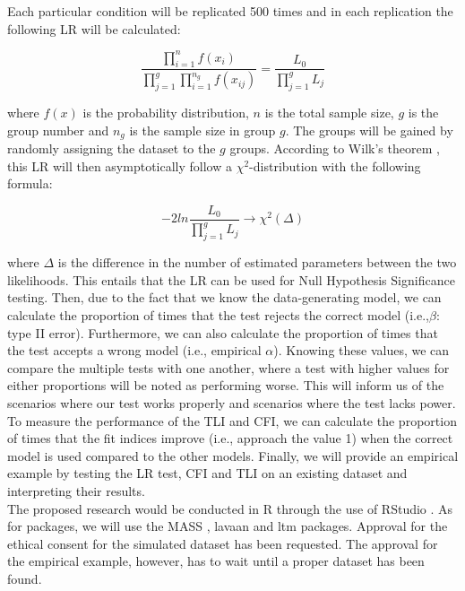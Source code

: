 \documentclass{article}
\begin{document}
Each particular condition will be replicated 500 times and in each replication the following LR will be calculated:

\begingroup
\Large
\begin{equation}
\frac{\prod_{i=1}^n f(x_i)}{\prod_{j=1}^g\prod_{i=1}^{n_g} f(x_{ij})} = \frac{L_0}{\prod_{j = 1}^g L_j}
\end{equation}
\endgroup

where $f(x)$ is the probability distribution, $n$ is the total sample size, $g$ is the group number and $n_g$ is the sample size in group $g$. The groups will be gained by randomly assigning the dataset to the $g$ groups. According to Wilk's theorem \autocite{wilkth}, this LR will then asymptotically follow a $\chi^2$-distribution with the following formula:

\begingroup
\Large
\begin{equation}
- 2ln\frac{L_0}{\prod_{j = 1}^g L_j} \rightarrow \chi^{2}(\Delta)
\end{equation}
\endgroup

where $\Delta$ is the difference in the number of estimated parameters between the two likelihoods. This entails that the LR can be used for Null Hypothesis Significance testing. Then, due to the fact that we know the data-generating model, we can calculate the proportion of times that the test rejects the correct model (i.e.,$\beta$: type II error). Furthermore, we can also calculate the proportion of times that the test accepts a wrong model (i.e., empirical $\alpha$). Knowing these values, we can compare the multiple tests with one another, where a test with higher values for either proportions will be noted as performing worse. This will inform us of the scenarios where our test works properly and scenarios where the test lacks power. 
To measure the performance of the TLI and CFI, we can calculate the proportion of times that the fit indices improve (i.e., approach the value 1) when the correct model is used compared to the other models. Finally, we will provide an empirical example by testing the LR test, CFI and TLI on an existing dataset and interpreting their results. \\
\indent The proposed research would be conducted in R \autocite{R} through the use of RStudio \autocite{Rstudio}. As for packages, we will use the MASS \autocite{mass}, lavaan \autocite{lavaan} and ltm \autocite{ltmpack} packages. Approval for the ethical consent for the simulated dataset has been requested. The approval for the empirical example, however, has to wait until a proper dataset has been found.


\nocite{*}

\newpage
\printbibliography
\end{document}
